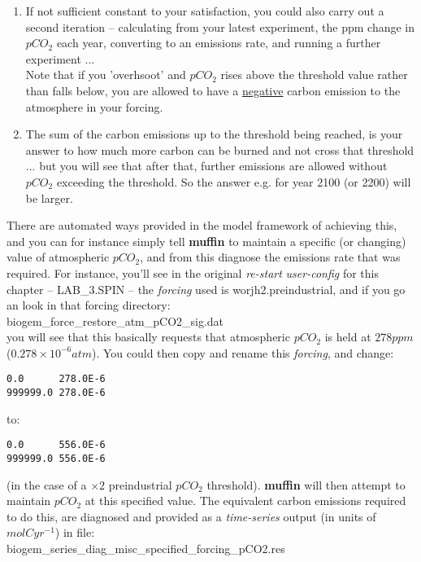 \begin{itemize}[noitemsep]
\begin{enumerate}[noitemsep]
\item If not sufficient constant to your satisfaction, you could also carry out a second iteration -- calculating from your latest experiment, the ppm change in \(pCO_{2}\) each year, converting to an emissions rate, and running a further experiment ...
\\Note that if you 'overhsoot' and \(pCO_{2}\) rises above the threshold value rather than falls below, you are allowed to have a \uline{negative} carbon emission to the atmosphere in your forcing.
\item The sum of the carbon emissions up to the threshold being reached, is your answer to how much more carbon can be burned and not cross that threshold ... but you will see that after that, further emissions are allowed without \(pCO_{2}\) exceeding the threshold. So the answer e.g. for year 2100 (or 2200) will be larger.
\end{enumerate}

\vspace{1mm} 
There are automated ways provided in the model framework of  achieving this, and you can for instance simply tell \textbf{muffin}  to maintain a specific (or changing) value of atmospheric \(pCO_{2}\), and from this diagnose the emissions rate that was required. For instance, you'll see in the original \textit{re-start} \textit{user-config} for this chapter -- \textsf{\footnotesize LAB\_3.SPIN} -- the \textit{forcing} used is 
\textsf{\footnotesize worjh2.preindustrial}, and if you go an look in that forcing directory:
\vspace{1mm}
\\\textsf{\footnotesize biogem\_force\_restore\_atm\_pCO2\_sig.dat} 
\vspace{1mm}
\\you will see that this basically requests that atmospheric \(pCO_{2}\) is held at \(278 ppm\) (\(0.278\times10^{-6} atm\)). You could then copy and rename this \textit{forcing}, and change:
\vspace{-2pt}\small\begin{verbatim}
0.0      278.0E-6
999999.0 278.0E-6
\end{verbatim}\normalsize\vspace{-2pt}
to:
\vspace{-2pt}\small\begin{verbatim}
0.0      556.0E-6
999999.0 556.0E-6
\end{verbatim}\normalsize\vspace{-2pt}
(in the case of a \(\times2\) preindustrial \(pCO_{2}\) threshold). \textbf{muffin} will then attempt to maintain \(pCO_{2}\) at this specified value. The equivalent carbon emissions required to do this, are diagnosed and provided as a \textit{time-series} output (in units of \(mol C yr^{-1}\)) in file: \\\textsf{\footnotesize biogem\_series\_diag\_misc\_specified\_forcing\_pCO2.res}


\end{itemize}
